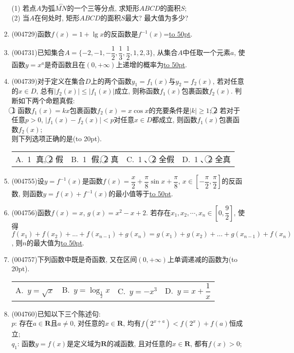 \documentclass[10pt,a4paper]{article}
\newcommand{\blank}[1]{\underline{\hbox to #1pt{}}}
\newcommand{\bracket}[1]{(\hbox to #1pt{})}
\newcommand{\fourch}[4]{\par\begin{tabular}{p{.23\textwidth}p{.23\textwidth}p{.23\textwidth}p{.23\textwidth}}
A.~#1 &B.~#2& C.~#3& D.~#4
\end{tabular}}
\begin{document}
\begin{enumerate}[1.]
\begin{center}
\end{center}
(1) 若点$A$为弧$\overset\frown{MN}$的一个三等分点, 求矩形$ABCD$的面积$S$;\\
(2) 当$A$在何处时, 矩形$ABCD$的面积$S$最大? 最大值为多少?
\item {\tiny (004729)}函数$f(x)=1+\lg x$的反函数是$f^{-1}(x)$=\blank{50}.
\item {\tiny (004731)}已知集合$A=\{-2,-1,-\dfrac 12,\dfrac 13,\dfrac 12,1,2,3\}$, 从集合$A$中任取一个元素$a$, 使函数$y=x^a$是奇函数且在$(0,+\infty)$上递增的概率为\blank{50}.
\item {\tiny (004739)}对于定义在集合$D$上的两个函数$y_1=f_1(x)$与$y_2=f_2(x)$, 若对任意的$x\in D$, 总有$|f_2(x)|\le |f_1(x)|$成立, 则称函数$f_1(x)$包裹函数$f_2(x)$. 判断如下两个命题真假:\\
\textcircled{1}  函数$f_1(x)=kx$包裹函数$f_2(x)=x\cos x$的充要条件是$|k|\ge 1$;
\textcircled{2}  若对于任意$p>0$, $|f_1(x)-f_2(x)|<p$对任意$x\in D$都成立, 则函数$f_1(x)$包裹函数$f_2(x)$;\\
则下列选项正确的是\bracket{20}.
\fourch{\textcircled{1} 真, \textcircled{2} 假}{\textcircled{1} 假, \textcircled{2} 真}{\textcircled{1}、\textcircled{2} 全假}{\textcircled{1}、\textcircled{2} 全真}
\item {\tiny (004755)}设$y=f^{-1}(x)$是函数$f(x)=\dfrac x2+\dfrac{\pi}8\sin x+\dfrac{\pi}8$, $x\in [-\dfrac{\pi }2,\dfrac{\pi }2]$的反函数, 则函数$y=f(x)+f^{-1}(x)$的最小值等于\blank{50}.
\item {\tiny (004756)}函数$f(x)=x$, $g(x)=x^2-x+2$. 若存在$x_1, x_2,\cdots,x_n\in [0,\dfrac 92]$, 使得$f(x_1)+f(x_2)+...+f(x_{n-1})+g(x_n)=g(x_1)+g(x_2)+...+g(x_{n-1})+f(x_n)$, 则$n$的最大值为\blank{50}.
\item {\tiny (004757)}下列函数中既是奇函数, 又在区间$(0,+\infty)$上单调递减的函数为\bracket{20}.
\fourch{$y=\sqrt x$}{$y=\log_{\frac 12}x$}{$y=-x^3$}{$y=x+\dfrac 1x$}
\item {\tiny (004760)}已知以下三个陈述句:\\
$p$: 存在$a\in \mathbf{R}$且$a\ne 0$, 对任意的$x\in \mathbf{R}$, 均有$f(2^{x+a})<f(2^x)+f(a)$恒成立;\\
$q_1$: 函数$y=f(x)$是定义域为$\mathbf{R}$的减函数, 且对任意的$x\in \mathbf{R}$, 都有$f(x)>0$;\\

\end{enumerate}
\end{document}
